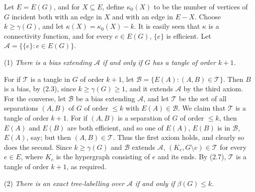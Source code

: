 Let $E = E(G)$, and for $X \subseteq E$, define $\kappa_0(X)$ to be the number of vertices of $G$ incident both with an edge in $X$ and with an edge in $E - X$. Choose $k \ge \gamma(G)$, and let $\kappa(X) = \kappa_0(X) - k$. It is easily seen that $\kappa$ is a connectivity function, and for every $e \in E(G)$, $\{e\}$ is efficient. Let $\mathscr{A} = \{\{e\} : e \in E(G)\}$.

\hspace*{12pt}(1) \textit{There is a bias extending $\mathscr{A}$ if and only if $G$ has a tangle of order $k + 1$.}

For if $\mathscr{T}$ is a tangle in $G$ of order $k + 1$, let $\mathscr{B} = \{E(A) : (A, B) \in \mathscr{T}\}$. Then $B$ is a bias, by (2.3), since $k \ge \gamma(G) \ge 1$, and it extends $\mathscr{A}$ by the third axiom. For the converse, let $\mathscr{B}$ be a bias extending $\mathscr{A}$, and let $\mathscr{T}$ be the set of all separations $(A, B)$ of $G$ of order $\le k$ with $E(A) \in \mathscr{B}$. We claim that $\mathscr{T}$ is a tangle of order $k + 1$. For if $(A, B)$ is a separation of $G$ of order $\le k$, then $E(A)$ and $E(B)$ are both efficient, and so one of $E(A)$, $E(B)$ is in $\mathscr{B}$, $E(A)$, say; but then $(A, B) \in \mathscr{T}$. Thus the first axiom holds, and clearly so does the second. Since $k \ge \gamma(G)$ and $\mathscr{B}$ extends $\mathscr{A}$, $(K_e, G \setminus e) \in \mathscr{T}$ for every $e \in E$, where $K_e$ is the hypergraph consisting of $e$ and its ends. By (2.7), $\mathscr{T}$ is a tangle of order $k + 1$, as required.

\hspace*{12pt}(2) \textit{There is an exact tree-labelling over $\mathscr{A}$ if and only if $\beta(G) \le k$.}
